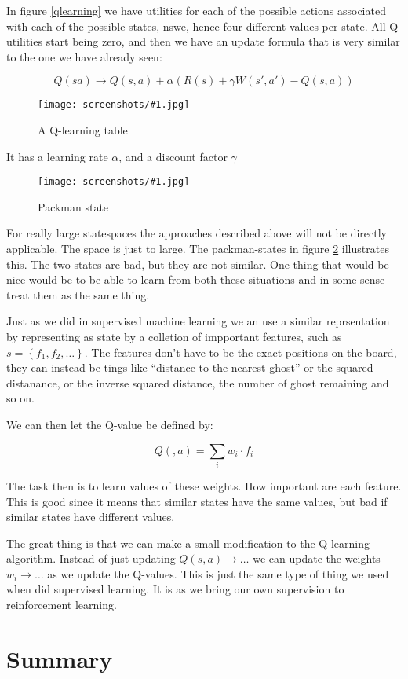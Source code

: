 \documentclass[a4, 12pt, english, USenglish]{scrreprt}
\newcommand{\screenshot}[2]{
\begin{figure}[htb]
\texttt{[image: screenshots/\#1.jpg]}
\label{#1}
\caption{#2}
\end{figure}}
\newcommand{\parens}[1]{\ensuremath{\left({#1}\right)}}
\begin{document}

In figure \ref{qlearning} we have utilities for each of the possible
actions associated with each of the possible states, nswe, hence four
different values per state.  All Q-utilities start being zero, and
then we have an update formula that is very similar to the one we have
already seen:

\[
 Q(sa) \rightarrow Q(s, a) + \alpha\parens{R(s) + \gamma W(s', a') - Q(s,a)}
\]

\screenshot{qlearningtable}{A Q-learning table}

It has a learning rate \(\alpha\), and a discount factor \(\gamma\)

\screenshot{packmanstate}{Packman state}

For really large statespaces the approaches described above will not
be directly applicable.  The space is just to large.  The
packman-states in figure \ref{packmanstate} illustrates this.  The two
states  are bad, but they are not similar.  One thing that would be
nice would be to be able to learn from both these situations and in
some sense treat them as the same thing.

Just as we did in supervised machine learning we an use a similar
reprsentation by representing as state by a colletion of impportant
features, such as \(s = \left\{f_1, f_2, \ldots\right\} \). The features
don't have to be the exact positions on the board, they can instead be 
tings like ``distance to the nearest ghost'' or the squared
distanance, or the inverse squared distance, the number of ghost
remaining and so on.

We can then let the Q-value be defined by:

\[
    Q(,a) = \sum_i w_i \cdot f_i
\]


The task then is to learn values of these weights.  How important are
each feature.   This is good since it means that similar states have
the same values, but bad if similar states have different values.

The great thing is that we can make a small modification to the
Q-learning algorithm.  Instead of just updating \(Q(s,a) \rightarrow
\ldots\) we can update the weights \(w_i \rightarrow
\ldots\) as we update the Q-values.  This is just the same type of
thing we used when did supervised learning.  It is as we bring our own
supervision to reinforcement learning.

\section{Summary}
\end{document}
